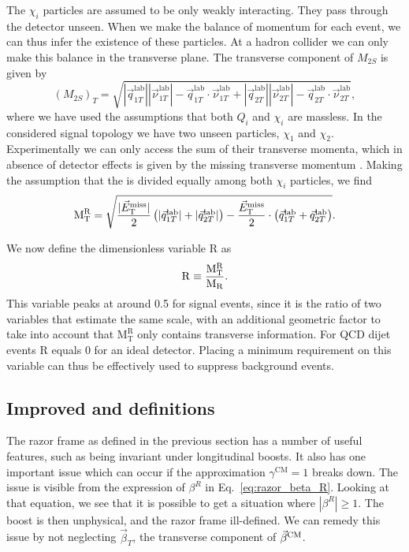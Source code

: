 The $\chi_i$ particles are assumed to be only weakly interacting. They pass through the detector
unseen. When we make the balance of momentum for each event, we can thus infer the existence of
these particles. At a hadron collider we can only make this balance in the transverse plane. The
transverse component of $M_{2S}$ is given by
\begin{equation}
  (M_{2S})_T = \sqrt{ |\vec{q}^{\textrm{lab}}_{1T}| |\vec{\nu}^{\textrm{lab}}_{1T}| -
\vec{q}^{\textrm{lab}}_{1T} \cdot \vec{\nu}^{\textrm{lab}}_{1T} 
                  + |\vec{q}^{\textrm{lab}}_{2T}| |\vec{\nu}^{\textrm{lab}}_{2T}| -
\vec{q}^{\textrm{lab}}_{2T} \cdot \vec{\nu}^{\textrm{lab}}_{2T}} ,
\end{equation}
where we have used the assumptions that both $Q_i$ and $\chi_i$ are massless. 
In the considered signal topology we have two unseen particles, $\chi_1$ and $\chi_2$.
Experimentally we can only access the sum of their transverse momenta, which in absence of detector
effects is given by the missing transverse momentum \VEtmiss. Making the assumption that the
\VEtmiss is divided equally among both $\chi_i$ particles, we find
\begin{equation}
  \mathrm{M_T^R} = \sqrt{\frac{|{\vec E}_{\mathrm{T}}^{\text{miss}}|}{2} \left(|\vec{q}^{\textrm{lab}}_{1T}| +
|\vec{q}^{\textrm{lab}}_{2T}| \right) - \frac{{\vec E}_{\mathrm{T}}^{\text{miss}}}{2} \cdot \left(\vec{q}^{\textrm{lab}}_{1T} +
\vec{q}^{\textrm{lab}}_{2T} \right)} .
\end{equation}

We now define the dimensionless variable $\mathrm{R}$ as
\begin{equation}
  \mathrm{R} \equiv \frac{\mathrm{M_T^R}}{\mathrm{M_R}} .
\end{equation}
This variable peaks at around 0.5 for signal events, since it is the ratio of two variables that
estimate the same scale, with an additional geometric factor to take into account that
$\mathrm{M_T^R}$ only contains transverse information. For QCD dijet events $\mathrm{R}$ equals 0
for an ideal detector. Placing a minimum requirement on this variable can thus
be effectively used to suppress background events.


\subsection{Improved \texorpdfstring{\mr and \rsq}{MR and R2} definitions
\label{sec:razor_mr_r2_improved}}

The razor frame as defined in the previous section has a number of useful features, such as \mr
being invariant under longitudinal boosts. It also has one important issue which can occur if the
approximation $\gamma^{\textrm{CM}} = 1$ breaks down. The issue is visible from the expression of
$\beta^R$ in Eq.~\ref{eq:razor_beta_R}. Looking at that equation, we see that it is possible to get
a situation where $|\beta^R| \geq 1$. The boost is then unphysical, and the razor frame ill-defined.
We can remedy this issue by not neglecting $\vec{\beta}_T$, the transverse component of
$\vec{\beta}^{\textrm{CM}}$. 

